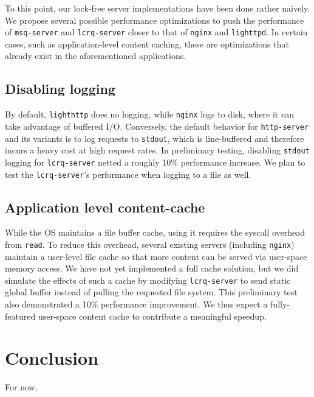 \documentclass[twoside]{article}
\begin{document}
\begin{multicols}{2}
To this point, our lock-free server implementations have been done
rather naively. We propose several possible performance optimizations
to push the performance of \verb+msq-server+ and \verb+lcrq-server+
closer to that of \verb+nginx+ and \verb+lighttpd+. In certain cases,
such as application-level content caching, these are optimizations
that already exist in the aforementioned applications.

\subsection{Disabling logging}
By default, \verb+lighthttp+ does no logging, while \verb+nginx+ logs
to disk, where it can take advantage of buffered I/O. Conversely, the
default behavior for \verb+http-server+ and its variants is to log
requests to \verb+stdout+, which is line-buffered and therefore incurs
a heavy cost at high request rates. In preliminary testing, disabling
\verb+stdout+ logging for \verb+lcrq-server+ netted a roughly 10\%
performance increase. We plan to test the \verb+lcrq-server+'s
performance when logging to a file as well.

\subsection{Application level content-cache}
While the OS maintains a file buffer cache, using it requires the
syscall overhead from \verb+read+. To reduce this overhead, several
existing servers (including \verb+nginx+) maintain a user-level file
cache so that more content can be served via user-space memory
access. We have not yet implemented a full cache solution, but we did
simulate the effects of such a cache by modifying \verb+lcrq-server+
to send static global buffer instead of pulling the requested file
system. This preliminary test also demonstrated a 10\% performance
improvement. We thus expect a fully-featured user-space content cache
to contribute a meaningful speedup.

\section{Conclusion}
For now, 

\end{multicols}
\end{document}

